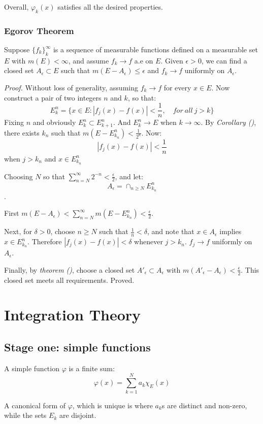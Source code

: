 \documentclass[
]{article}
\begin{document}
Overall, \(\varphi_k(x)\) satisfies all the desired properties.

\subsubsection{Egorov Theorem}
Suppose \(\{f_k\}_k^{\infty}\) is a sequence of measurable functions defined on a
measurable set \(E\) with \(m(E)<\infty\), and assume \(f_k \to f \) a.e on \(E\).
Given \(\epsilon > 0\), we can find a closed set \(A_{\epsilon}\subset E\) such that
\(m(E-A_{\epsilon})\leq \epsilon\) and \(f_k\to f\) uniformly on \(A_{\epsilon}\).

\textit{Proof.} Without loss of generality, assuming \(f_k\to f\) for every \(x\in E\).
Now construct a pair of two integers \(n\) and \(k\), so that:
\[E_k^n = \{x\in E: |f_j(x)-f(x)|<\frac{1}{n},\quad for\ all\ j>k\}\]
Fixing \(n\) and obviously \(E_k^n\subset E_{k+1}^n\). And \(E_k^n \to E\) when \(k\to \infty\).
By \textit{Corollary ()}, there exists \(k_n\) such that \(m(E-E_{k_n}^n)<\frac{1}{2^n}\).
Now:
\[|f_j(x)-f(x)|<\frac{1}{n}\]
when \(j>k_n\) and \(x\in E_{k_n}^n\)

Choosing \(N\) so that \(\sum_{n=N}^{\infty}2^{-n}<\frac{\epsilon}{2}\), and let:
\[A_{\epsilon}=\cap_{n\geq N}E_{k_n}^n\].

First \(m(E-A_{\epsilon})<\sum_{n=N}^{\infty}m(E-E_{k_n}^n)<\frac{\epsilon}{2}\).

Next, for \(\delta>0\), choose \(n\geq N\) such that \(\frac{1}{n}<\delta\), and note that \(x\in A_{\epsilon}\)
implies \(x\in E_{k_n}^n\). Therefore \(|f_j(x)-f(x)| < \delta\) whenever \(j > k_n\). \(f_j\to f\) uniformly on
\(A_{\epsilon}\).

Finally, by \textit{theorem ()}, choose a closed set \(A'_{\epsilon}\subset A_{\epsilon}\) with
\(m(A'_{\epsilon}-A_{\epsilon})<\frac{\epsilon}{2}\). This closed set meets all requirements. Proved.

\section{Integration Theory}

\subsection{Stage one: simple functions}
A simple function \(\varphi\) is a finite sum:
\[\varphi(x)=\sum_{k=1}^N a_k \chi_{E}(x)\]

A canonical form of \(\varphi\), which is unique is where \(a_k\)s are distinct and non-zero, while
the sets \(E_k\) are disjoint.
\end{document}
